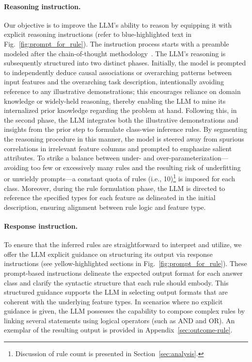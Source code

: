 \paragraph{Reasoning instruction.} Our objective is to improve the LLM's ability to reason by equipping it with explicit reasoning instructions (refer to blue-highlighted text in Fig.~\ref{fig:prompt_for_rule}). The instruction process starts with a preamble modeled after the chain-of-thought methodology~\cite{wei2022chain}. The LLM's reasoning is subsequently structured into two distinct phases. Initially, the model is prompted to independently deduce causal associations or overarching patterns between input features and the overarching task description, intentionally avoiding reference to any illustrative demonstrations; this encourages reliance on domain knowledge or widely-held reasoning, thereby enabling the LLM to mine its internalized prior knowledge regarding the problem at hand. Following this, in the second phase, the LLM integrates both the illustrative demonstrations and insights from the prior step to formulate class-wise inference rules. By segmenting the reasoning procedure in this manner, the model is steered away from spurious correlations in irrelevant feature columns and prompted to emphasize salient attributes. To strike a balance between under- and over-parameterization—avoiding too few or excessively many rules and the resulting risk of underfitting or unwieldy prompts—a constant quota of rules (i.e., 10)\footnote{Discussion of rule count is presented in Section~\ref{sec:analysis}.} is imposed for each class. Moreover, during the rule formulation phase, the LLM is directed to reference the specified types for each feature as delineated in the initial description, ensuring alignment between rule logic and feature type.

\vspace*{-0.12in}
\paragraph{Response instruction.} To ensure that the inferred rules are straightforward to interpret and utilize, we offer the LLM explicit guidance on structuring its output via response instructions (see yellow-highlighted sections in Fig.~\ref{fig:prompt_for_rule}). These prompt-based instructions delineate the expected output format for each answer class and clarify the syntactic structure that each rule should embody. This structured guidance supports the LLM in selecting output formats that are coherent with the underlying feature types. In scenarios where no explicit guidance is given, the LLM possesses the capability to compose complex rules by linking several statements using logical operators (such as AND and OR). An exemplar of the resulting output is provided in Appendix~\ref{sec:outcome-rule}.

